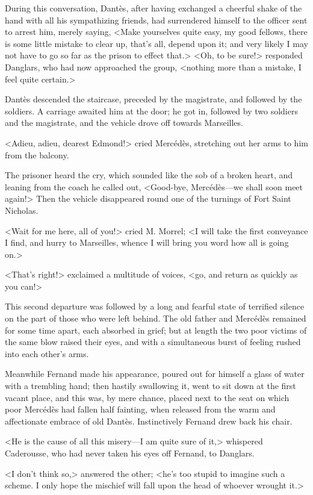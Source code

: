  During this conversation, Dantès, after having exchanged a cheerful shake of the hand with all his sympathizing friends, had surrendered himself to the officer sent to arrest him, merely saying, <Make yourselves quite easy, my good fellows, there is some little mistake to clear up, that's all, depend upon it; and very likely I may not have to go so far as the prison to effect that.>  <Oh, to be sure!> responded Danglars, who had now approached the group, <nothing more than a mistake, I feel quite certain.> 

 Dantès descended the staircase, preceded by the magistrate, and followed by the soldiers. A carriage awaited him at the door; he got in, followed by two soldiers and the magistrate, and the vehicle drove off towards Marseilles. 

 <Adieu, adieu, dearest Edmond!> cried Mercédès, stretching out her arms to him from the balcony. 

 The prisoner heard the cry, which sounded like the sob of a broken heart, and leaning from the coach he called out, <Good-bye, Mercédès—we shall soon meet again!> Then the vehicle disappeared round one of the turnings of Fort Saint Nicholas. 

 <Wait for me here, all of you!> cried M. Morrel; <I will take the first conveyance I find, and hurry to Marseilles, whence I will bring you word how all is going on.> 

 <That's right!> exclaimed a multitude of voices, <go, and return as quickly as you can!> 

 This second departure was followed by a long and fearful state of terrified silence on the part of those who were left behind. The old father and Mercédès remained for some time apart, each absorbed in grief; but at length the two poor victims of the same blow raised their eyes, and with a simultaneous burst of feeling rushed into each other's arms. 

 Meanwhile Fernand made his appearance, poured out for himself a glass of water with a trembling hand; then hastily swallowing it, went to sit down at the first vacant place, and this was, by mere chance, placed next to the seat on which poor Mercédès had fallen half fainting, when released from the warm and affectionate embrace of old Dantès. Instinctively Fernand drew back his chair. 

 <He is the cause of all this misery—I am quite sure of it,> whispered Caderousse, who had never taken his eyes off Fernand, to Danglars. 

 <I don't think so,> answered the other; <he's too stupid to imagine such a scheme. I only hope the mischief will fall upon the head of whoever wrought it.> 

